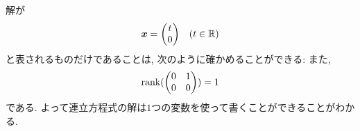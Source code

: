 \begin{checkanswer}%
  解が
  \begin{align*}
    \boldsymbol{x}=\begin{pmatrix}t\\0\end{pmatrix}&&(t\in\mathbb{R})
  \end{align*}
  と表されるものだけであることは,
  次のように確かめることができる:
  また,
  \begin{align*}
    \operatorname{rank}(
    \begin{pmatrix}0&1\\0&0\end{pmatrix}
    )=1
  \end{align*}
  である.
  よって連立方程式の解は$1$つの変数を使って書くことができることがわかる.
\end{checkanswer}

